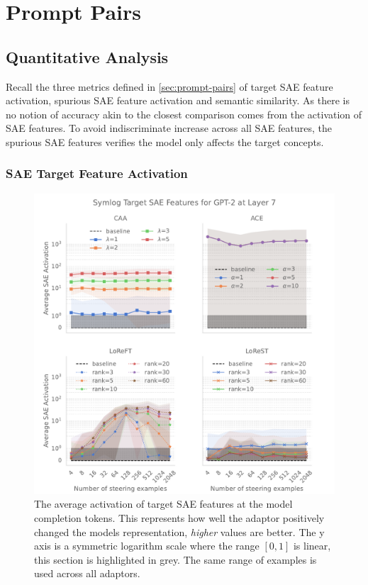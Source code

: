 \section{Prompt Pairs}
\label{sec:prompt-pairs-res}

\subsection{Quantitative Analysis}
\label{sec:quant}

Recall the three metrics defined in \cref{sec:prompt-pairs} of target SAE feature activation, spurious SAE feature activation and semantic similarity.
As there is no notion of accuracy akin to \citet{steering-clear} the closest comparison comes from the activation of SAE features.
To avoid indiscriminate increase across all SAE features, the spurious SAE features verifies the model only affects the target concepts.

\subsubsection{SAE Target Feature Activation}

\begin{figure}
    \centering
    \captionsetup{width=\textwidth}
    \includegraphics[width=\textwidth]{figures/gpt2_7_target.pdf}
    \caption{
        The average activation of target SAE features at the model completion tokens.
        This represents how well the adaptor positively changed the models representation, \emph{higher} values are better.
        The y axis is a symmetric logarithm scale where the range $[0,1]$ is linear, this section is highlighted in grey.
        The same range of examples is used across all adaptors.
    }
    \label{fig:gpt-pp-target}
\end{figure}

